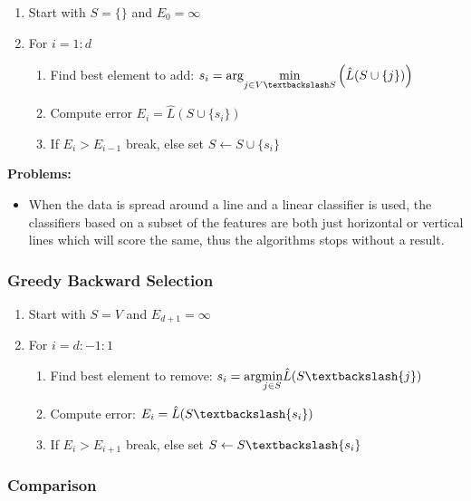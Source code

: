 \documentclass[10pt,a4paper]{scrartcl}
\newcommand{\Argmin}[2]{\text{arg}\underset{#1}{\min}\left(#2\right)}
\begin{document}
\begin{multicols*}{2}
\begin{enumerate}
\item Start with $S=\{\}$ and $E_0=\infty$
\item For $i=1:d$
\begin{enumerate}
\item Find best element to add: $s_i=\Argmin{j\in V\textbackslash S}{\hat{L}(S\cup\{j\})}$
\item Compute error $E_i=\hat{L}(S\cup\{s_i\})$
\item If $E_i>E_{i-1}$ break, else set $S\leftarrow S\cup\{s_i\}$
\end{enumerate}
\end{enumerate}

\textbf{Problems:}

\begin{itemize}
\item When the data is spread around a line and a linear classifier is used, the classifiers based on a subset of the features are both just horizontal or vertical lines which will score the same, thus the algorithms stops without a result.
\end{itemize}

\subsubsection{Greedy Backward Selection}

\begin{enumerate}
\item Start with $S=V$ and $E_{d+1}=\infty$
\item For $i=d:-1:1$
\begin{enumerate}
\item Find best element to remove: $s_i=\text{arg}\underset{j\in S}{\min}\hat{L}(S\textbackslash\{j\})$
\item Compute error: $E_i=\hat{L}(S\textbackslash\{s_i\})$
\item If $E_i>E_{i+1}$ break, else set $S\leftarrow S\textbackslash \{s_i\}$
\end{enumerate}
\end{enumerate}

\subsubsection{Comparison}


\end{multicols*}
\end{document}

